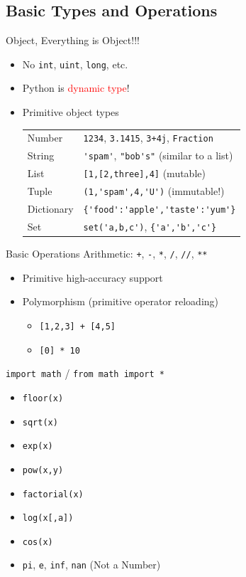 \documentclass{../TexTemplate/myslide}
\begin{document}
\subsection{Basic Types and Operations}
\begin{frame}[fragile]{Object, Everything is Object!!!}
\begin{itemize}
\item No \verb'int', \verb'uint', \verb'long', etc.
\item Python is \textcolor{red}{dynamic type}!
\item Primitive object types
\begin{center}
\begin{tabular}{ll}\hline
Number & \verb'1234', \verb'3.1415', \verb'3+4j', \verb'Fraction'\\
String & \verb;'spam';, \verb;"bob's"; (similar to a list)\\
List & \verb'[1,[2,three],4]' (mutable)\\
Tuple & \verb;(1,'spam',4,'U'); (immutable!)\\
Dictionary & \verb;{'food':'apple','taste':'yum'};\\
Set & \verb;set('a,b,c');, \verb;{'a','b','c'};\\\hline
\end{tabular}
\end{center}
\end{itemize}
\end{frame}

\begin{frame}[fragile]{Basic Operations}
Arithmetic: \verb'+', \verb'-', \verb'*', \verb'/', \verb'//', \verb'**'
\begin{itemize}
	\item Primitive high-accuracy support
	\item Polymorphism (primitive operator reloading)
	\begin{itemize}
		\item \verb'[1,2,3] + [4,5]'
		\item \verb'[0] * 10'
	\end{itemize}
\end{itemize}
\pause
\verb'import math' / \verb'from math import *'
\begin{itemize}
	\item \verb'floor(x)'
	\item \verb'sqrt(x)'
	\item \verb'exp(x)'
	\item \verb'pow(x,y)'
	\item \verb'factorial(x)'
	\item \verb'log(x[,a])'
	\item \verb'cos(x)'
	\item \verb'pi', \verb'e', \verb'inf', \verb'nan' (Not a Number)
\end{itemize}
\end{frame}
\end{document}
